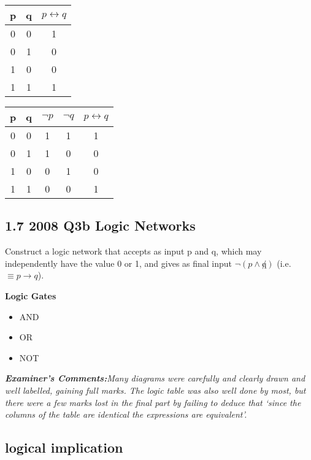 \documentclass[]{report}
\begin{document}
\begin{tabular}{|c|c|c|}
\hline  p& q & $p \leftrightarrow q$ \\ 
\hline  0& 0 &  1\\ 
\hline  0& 1 &  0\\ 
\hline  1& 0 &  0\\ 
\hline  1& 1 &  1\\ 
\hline 
\end{tabular} 


\begin{tabular}{|c|c|c|c|c|}
\hline  p& q & $\neg p$ & $\neg q$ & $p \leftrightarrow q$ \\ 
\hline  0& 0 & 1& 1 & 1\\ 
\hline  0& 1 &  1& 0& 0\\ 
\hline  1& 0 &  0& 1& 0\\ 
\hline  1& 1 &  0 & 0& 1\\ 
\hline 
\end{tabular} 
\newpage
\subsection*{1.7 2008 Q3b Logic Networks }

Construct a logic network that accepts as input p and q, which may independently have the value 0 or 1, and
gives as final input $\neg(p \wedge \not q)$ (i.e. $\equiv p \rightarrow q$).\\
\bigskip

\textbf{Logic Gates}
\begin{itemize}
\item AND
\item OR
\item NOT
\end{itemize}
\bigskip

\emph{\textbf{Examiner's Comments:}Many
diagrams were carefully and clearly drawn and well labelled, gaining full
marks. The logic table was also well done by most, but there were a few marks
lost in the final part by failing to deduce that ‘since the columns of the table are
identical the expressions are equivalent’.}

\subsection{logical implication}
\end{document}
